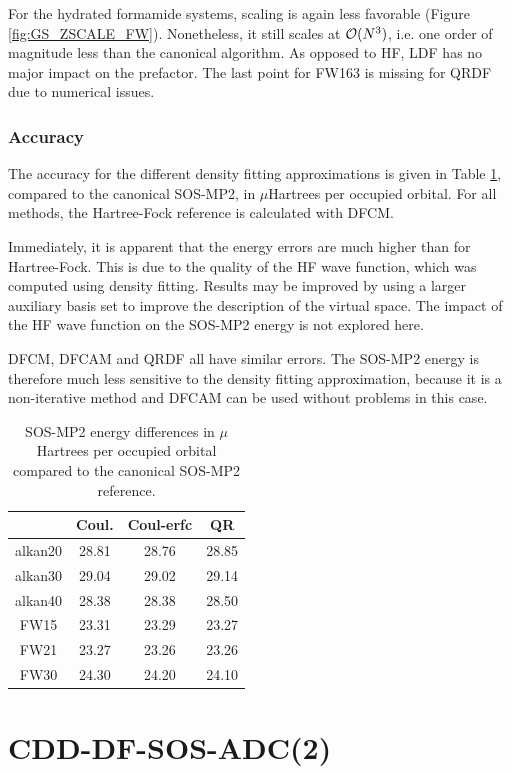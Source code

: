 For the hydrated formamide systems, scaling is again less favorable (Figure \ref{fig:GS_ZSCALE_FW}). Nonetheless, it still scales at $\mathcal{O}(N^{3})$, i.e. one order of magnitude less than the canonical algorithm. As opposed to HF, LDF has no major impact on the prefactor. The last point for FW163 is missing for QRDF due to numerical issues.  

\subsubsection{Accuracy}

The accuracy for the different density fitting approximations is given in Table \ref{fig:GS_ZACCURACY}, compared to the canonical SOS-MP2, in $\mu$Hartrees per occupied orbital. For all methods, the Hartree-Fock reference is calculated with DFCM.

Immediately, it is apparent that the energy errors are much higher than for Hartree-Fock. This is due to the quality of the HF wave function, which was computed using density fitting. Results may be improved by using a larger auxiliary basis set to improve the description of the virtual space. The impact of the HF wave function on the SOS-MP2 energy is not explored here.

DFCM, DFCAM and QRDF all have similar errors. The SOS-MP2 energy is therefore much less sensitive to the density fitting approximation, because it is a non-iterative method and DFCAM can be used without problems in this case. 

\begin{table}[h]
\centering
\begin{tabular}{cccc}
 \hline
 & Coul. & Coul-erfc & QR\\ \hline 
alkan20 & 28.81 & 28.76 & 28.85 \\ 
alkan30  & 29.04 & 29.02 & 29.14 \\ 
alkan40 & 28.38 & 28.38 & 28.50 \\ 
FW15 & 23.31 & 23.29 & 23.27 \\ 
FW21 & 23.27 & 23.26 & 23.26 \\ 
FW30 & 24.30 & 24.20 & 24.10 \\ 
\hline 
\end{tabular}
\caption{SOS-MP2 energy differences in $\mu$Hartrees per occupied orbital compared to the canonical SOS-MP2 reference.}
\label{fig:GS_ZACCURACY}
\end{table}

\section{CDD-DF-SOS-ADC(2)}

